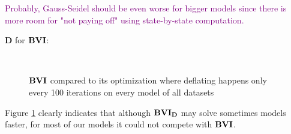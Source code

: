 \textcolor{purple}{Probably, Gauss-Seidel should be even worse for bigger models since there is more room for "not paying off" using state-by-state computation.}


$\mathbf{D}$ for $\mathbf{BVI}$:
\begin{figure}[h!]
    \centering
    \
    \caption{$\mathbf{BVI}$ compared to its optimization where deflating happens only every 100 iterations on every model of all datasets}%
    \label{fig:Scatter_D}%
    \end{figure}
\FloatBarrier
Figure \ref{fig:Scatter_D} clearly indicates that although $\mathbf{BVI_D}$ may solve sometimes models faster, 
for most of our models it could not compete with $\mathbf{BVI}$.

